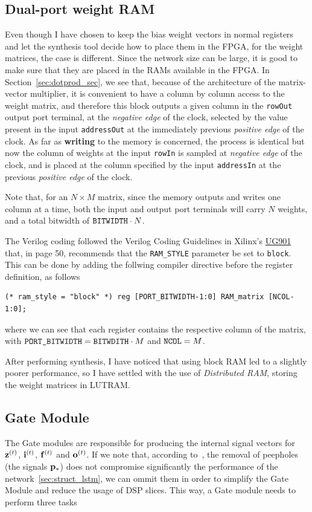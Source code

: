 \subsection{Dual-port weight RAM}
Even though I have chosen to keep the bias weight vectors in normal registers and let the synthesis tool decide how to place them in the FPGA, for the weight matrices, the case is different. Since the network size can be large, it is good to make sure that they are placed in the RAMs available in the FPGA. In Section~\ref{sec:dotprod_sec}, we see that, because of the architecture of the matrix-vector multiplier, it is convenient to have a column by column access to the weight matrix, and therefore this block outputs a given column in the \verb+rowOut+ output port terminal, at the \emph{negative edge} of the clock, selected by the value present in the input \verb+addressOut+ at the immediately previous \emph{positive edge} of the clock. As far as \textbf{writing} to the memory is concerned, the process is identical but now the column of weights at the input \verb+rowIn+ is sampled at \emph{negative edge} of the clock, and is placed at the column specified by the input \verb+addressIn+ at the previous \emph{positive edge} of the clock. 

Note that, for an $N \times M$ matrix, since the memory outputs and writes one column at a time, both the input and output port terminals will carry $N$ weights, and a total bitwidth of $\verb+BITWIDTH+ \cdot N$. 

The Verilog coding followed the Verilog Coding Guidelines in Xilinx's \href{http://www.xilinx.com/support/documentation/sw_manuals/xilinx2015_2/ug901-vivado-synthesis.pdf}{UG901} that, in page 50, recommends that the \verb+RAM_STYLE+ parameter be set to \verb+block+. This can be done by adding the follwing compiler directive before the register definition, as follows

\begin{verbatim}
(* ram_style = "block" *) reg [PORT_BITWIDTH-1:0] RAM_matrix [NCOL-1:0];
\end{verbatim}
where we can see that each register contains the respective column of the matrix, with $\verb+PORT_BITWIDTH+ = \verb+BITWDITH+ \cdot M$ and $\verb+NCOL+ = M$.

After performing synthesis, I have noticed that using block RAM led to a slightly poorer performance, so I have settled with the use of \emph{Distributed RAM}, storing the weight matrices in LUTRAM.
 

\subsection{Gate Module}\label{sec:gatemod} 
The Gate modules are responsible for producing the internal signal vectors for $\mathbf{z}^{(t)}$, $\mathbf{i}^{(t)}$, $\mathbf{f}^{(t)}$ and $\mathbf{o}^{(t)}$. If we note that, according to~\cite{Greff15}, the removal of peepholes (the signals $\mathbf{p}_*$) does not compromise significantly the performance of the network~\ref{sec:struct_lstm}, we can ommit them in order to simplify the Gate Module and reduce the usage of DSP slices. This way, a Gate module needs to perform three tasks

